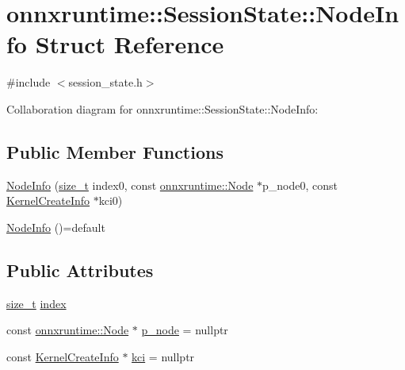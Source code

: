 \hypertarget{structonnxruntime_1_1SessionState_1_1NodeInfo}{}\section{onnxruntime\+:\+:Session\+State\+:\+:Node\+Info Struct Reference}
\label{structonnxruntime_1_1SessionState_1_1NodeInfo}


{\ttfamily \#include $<$session\+\_\+state.\+h$>$}



Collaboration diagram for onnxruntime\+:\+:Session\+State\+:\+:Node\+Info\+:
\subsection*{Public Member Functions}
\begin{DoxyCompactItemize}
\item 
\mbox{\hyperlink{structonnxruntime_1_1SessionState_1_1NodeInfo_a01c5c8327ac0d769082ca033041ae466}{Node\+Info}} (\mbox{\hyperlink{mlasi_8h_a503efbc1c6e50825320ad909366b78ab}{size\+\_\+t}} index0, const \mbox{\hyperlink{classonnxruntime_1_1Node}{onnxruntime\+::\+Node}} $\ast$p\+\_\+node0, const \mbox{\hyperlink{structonnxruntime_1_1KernelCreateInfo}{Kernel\+Create\+Info}} $\ast$kci0)
\item 
\mbox{\hyperlink{structonnxruntime_1_1SessionState_1_1NodeInfo_a73f4d0a31998878b48519a6823fffa2c}{Node\+Info}} ()=default
\end{DoxyCompactItemize}
\subsection*{Public Attributes}
\begin{DoxyCompactItemize}
\item 
\mbox{\hyperlink{mlasi_8h_a503efbc1c6e50825320ad909366b78ab}{size\+\_\+t}} \mbox{\hyperlink{structonnxruntime_1_1SessionState_1_1NodeInfo_a4e75d8571602012754441398680ac9cd}{index}}
\item 
const \mbox{\hyperlink{classonnxruntime_1_1Node}{onnxruntime\+::\+Node}} $\ast$ \mbox{\hyperlink{structonnxruntime_1_1SessionState_1_1NodeInfo_a2ef24261a2e71391a8fe4e01995998ab}{p\+\_\+node}} = nullptr
\item 
const \mbox{\hyperlink{structonnxruntime_1_1KernelCreateInfo}{Kernel\+Create\+Info}} $\ast$ \mbox{\hyperlink{structonnxruntime_1_1SessionState_1_1NodeInfo_ada3498a7678b3e295febb45d84dbc570}{kci}} = nullptr
\end{DoxyCompactItemize}


